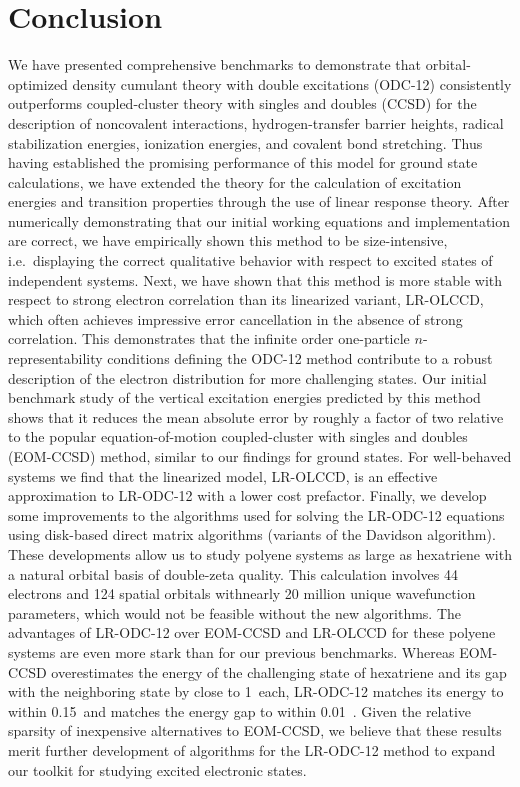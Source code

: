 \chapter{Conclusion}
\label{ch:conclusion}

We have presented comprehensive benchmarks to demonstrate that orbital-optimized
density cumulant theory with double excitations (ODC-12) consistently
outperforms coupled-cluster theory with singles and doubles (CCSD) for
the description of noncovalent interactions, hydrogen-transfer barrier
heights, radical stabilization energies, ionization energies, and covalent bond
stretching.
Thus having established the promising performance of this model for ground state
calculations, we have extended the theory for the calculation of excitation
energies and transition properties through the use of linear response theory.
After numerically demonstrating that our initial working equations and
implementation are correct, we have empirically shown this method to be
size-intensive, i.e.\ displaying the correct qualitative behavior with respect
to excited states of independent systems.
Next, we have shown that this method is more stable with respect to strong
electron correlation than its linearized variant, LR-OLCCD, which often achieves
impressive error cancellation in the absence of strong correlation.
This demonstrates that the infinite order one-particle \(n\)-representability
conditions defining the ODC-12 method contribute to a robust description of the
electron distribution for more challenging states.
Our initial benchmark study of the vertical excitation energies predicted by
this method shows that it reduces the mean absolute error by roughly a factor of
two relative to the popular equation-of-motion coupled-cluster with singles and
doubles (EOM-CCSD) method, similar to our findings for ground states.
For well-behaved systems we find that the linearized model, LR-OLCCD, is an
effective approximation to LR-ODC-12 with a lower cost prefactor.
Finally, we develop some improvements to the algorithms used for solving the
LR-ODC-12 equations using disk-based direct matrix algorithms (variants of the
Davidson algorithm).
These developments allow us to study polyene systems as large as hexatriene with
a natural orbital basis of double-zeta quality.
This calculation involves 44 electrons and 124 spatial orbitals withnearly 20
million unique wavefunction parameters, which would not be feasible without the
new algorithms.
The advantages of LR-ODC-12 over EOM-CCSD and LR-OLCCD for these polyene systems
are even more stark than for our previous benchmarks.
Whereas EOM-CCSD overestimates the energy of the challenging
 state of hexatriene and its gap with the neighboring
 state by close to 1~\eV each, LR-ODC-12 matches its energy
to within 0.15~\eV and matches the energy gap to within 0.01~\eV.
Given the relative sparsity of inexpensive alternatives to EOM-CCSD, we believe
that these results merit further development of algorithms for the LR-ODC-12
method to expand our toolkit for studying excited electronic states.

